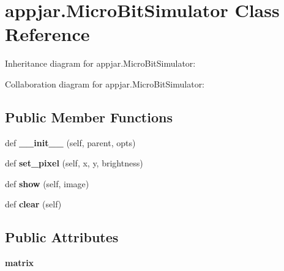 \hypertarget{classappjar_1_1_micro_bit_simulator}{}\section{appjar.\+Micro\+Bit\+Simulator Class Reference}
\label{classappjar_1_1_micro_bit_simulator}


Inheritance diagram for appjar.\+Micro\+Bit\+Simulator\+:


Collaboration diagram for appjar.\+Micro\+Bit\+Simulator\+:
\subsection*{Public Member Functions}
\begin{DoxyCompactItemize}
\item 
\mbox{\label{classappjar_1_1_micro_bit_simulator_acdb6c771d0731ac891cb60420fb3ce49}} 
def {\bfseries \+\_\+\+\_\+init\+\_\+\+\_\+} (self, parent, opts)
\item 
\mbox{\label{classappjar_1_1_micro_bit_simulator_a53b20ac8e1799a296ea38996a8837c05}} 
def {\bfseries set\+\_\+pixel} (self, x, y, brightness)
\item 
\mbox{\label{classappjar_1_1_micro_bit_simulator_a10c888c492acec8b914fcc6e7725a915}} 
def {\bfseries show} (self, image)
\item 
\mbox{\label{classappjar_1_1_micro_bit_simulator_a939d64918a61c2acba74b107d5f3819c}} 
def {\bfseries clear} (self)
\end{DoxyCompactItemize}
\subsection*{Public Attributes}
\begin{DoxyCompactItemize}
\item 
\mbox{\label{classappjar_1_1_micro_bit_simulator_ac34865b234ebe43e2518f9c343473561}} 
{\bfseries matrix}
\end{DoxyCompactItemize}
